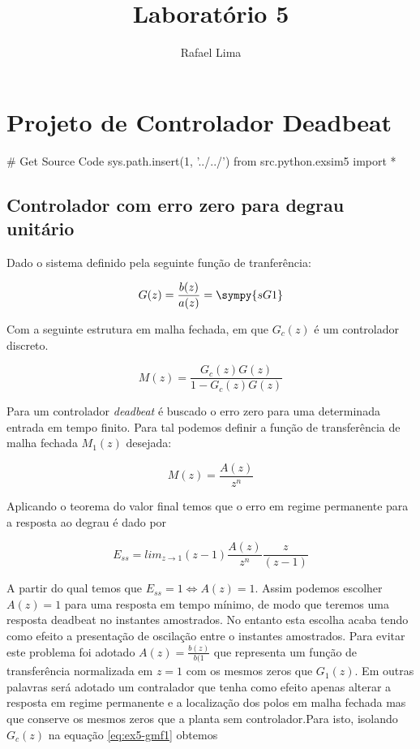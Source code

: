 \documentclass[a4paper,11pt]{article}
\title{Laboratório 5} %
\author{Rafael Lima}
\begin{document}

\section{Projeto de Controlador Deadbeat}

\begin{sympycode}
# Get Source Code
sys.path.insert(1, '../../')
from src.python.exsim5 import *
\end{sympycode}


\subsection{Controlador com erro zero para degrau unitário}

Dado o sistema definido pela seguinte função de tranferência:

\begin{equation}\label{eq:ex5-g1}
    G(z) = \frac{b(z)}{a(z)} = \sympy{sG1}
\end{equation}

Com a seguinte estrutura em malha fechada, em que $G_c(z)$ é um controlador discreto.

\begin{equation}
    M(z) = \frac{G_c(z)G(z)}{1 - G_c(z)G(z)}
\end{equation}

Para um controlador \textit{deadbeat} é buscado o erro zero para uma determinada entrada em tempo finito. Para tal podemos definir a função de transferência de malha fechada $M_1(z)$ desejada:

\begin{equation}\label{eq:ex5-gmf1}
    M(z) = \frac{A(z)}{z^n}
\end{equation}

Aplicando o teorema do valor final temos que o erro em regime permanente para a resposta ao degrau é dado por

$$E_{ss} = lim_{z \rightarrow 1}(z - 1)\frac{A(z)}{z^n}\frac{z}{(z-1)}$$

A partir do qual temos que $E_{ss} = 1 \Leftrightarrow A(z) = 1$. Assim podemos escolher $A(z) = 1$ para uma resposta em tempo mínimo, de modo que teremos uma resposta deadbeat no instantes amostrados. No entanto esta escolha acaba tendo como efeito a presentação de oscilação entre o instantes amostrados. Para evitar este problema foi adotado $A(z) = \frac{b(z)}{b(1}$ que representa um função de transferência normalizada em $z=1$ com os mesmos zeros que $G_1(z)$. Em outras palavras será adotado um contralador que tenha como efeito apenas alterar a resposta em regime permanente e a localização dos polos em malha fechada mas que conserve os mesmos zeros que a planta sem controlador.Para isto, isolando $G_c(z)$ na equação \ref{eq:ex5-gmf1} obtemos
\end{document}

